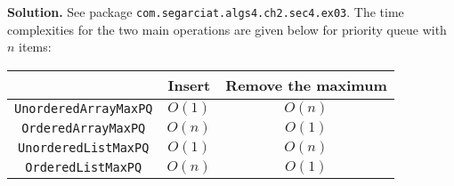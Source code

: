 \documentclass[12pt, a4paper]{article}
\newenvironment{sol}[1][Solution]
{\par\medskip\noindent \textbf{#1.} }
{\medskip}
\begin{document}
	\begin{sol}
		See package \texttt{com.segarciat.algs4.ch2.sec4.ex03}. The time complexities
		for the two main operations are given below for priority queue with $n$ items:
		\begin{center}
			\begin{tabular}{c|c|c}
				{} & Insert & Remove the maximum\\
				\hline
				\texttt{UnorderedArrayMaxPQ} & $O(1)$ & $O(n)$ \\
				\hline
				\texttt{OrderedArrayMaxPQ} & $O(n)$ & $O(1)$\\
				\hline
				\texttt{UnorderedListMaxPQ} & $O(1)$ & $O(n)$ \\
				\hline
				\texttt{OrderedListMaxPQ} & $O(n)$ & $O(1)$
			\end{tabular}
		\end{center}
	\end{sol}
	\pagebreak
	\printbibliography
\end{document}
